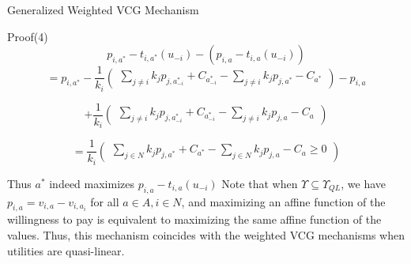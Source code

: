 \begin{frame}{Generalized Weighted VCG Mechanism}
\begin{block}{Proof(4)}
$$p_{i,a^{*}}-t_{i,a^{*}}(u_{-i}) - (p_{i,a}-t_{i,a}(u_{-i}))$$
$$ = p_{i,a^{*}} - \frac{1}{k_{i}}\begin{pmatrix}
\sum _{j \neq i}k_{j}p_{j,a_{-i}^{*}} + C_{a_{-i}^{*}} - \sum _{j \neq i}k_{j}p_{j,a^{*}} - C_{a^{*}}
\end{pmatrix} - p_{i,a}$$

$$+ \frac{1}{k_{i}}\begin{pmatrix}
\sum _{j \neq i}k_{j}p_{j,a_{-i}^{*}} + C_{a_{-i}^{*}} - \sum _{j \neq i}k_{j}p_{j,a} - C_{a}
\end{pmatrix}$$

$$= \frac{1}{k_{i}}\begin{pmatrix}
\sum _{j \in N}k_{j}p_{j,a^{*}} + C_{a^{*}} - \sum _{j \in N}k_{j}p_{j,a} - C_{a} \geq 0
\end{pmatrix}$$

Thus $a^{*}$ indeed maximizes $p_{i,a} - t_{i,a}(u_{-i})$ Note that when $\Upsilon \subseteq \Upsilon _{QL}$, we have $p_{i,a} = v_{i,a} - v_{i,a_{i}}$ for all $a \in A, i \in N$, and maximizing an affine function of the willingness to pay is equivalent to maximizing the same affine function of the values. Thus, this mechanism coincides with the weighted VCG mechanisms when utilities are quasi-linear.
\end{block}
\end{frame}
